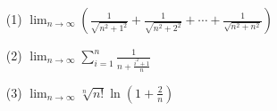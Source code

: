 \begin{xiti}
\begin{enumerate}
	\item[(1)] $\lim _ { n \rightarrow \infty } \left( \frac { 1 } { \sqrt { n ^ { 2 } + 1 ^ { 2 } } } + \frac { 1 } { \sqrt { n ^ { 2 } + 2 ^ { 2 } } } + \cdots + \frac { 1 } { \sqrt { n ^ { 2 } + n ^ { 2 } } } \right)$
	\item[(2)] $\lim _ { n \rightarrow \infty } \sum _ { i = 1 } ^ { n } \frac { 1 } { n + \frac { i ^ { 2 } + 1 } { n } }$
	\item[(3)] $\lim _ { n \rightarrow \infty } \sqrt [ n ] { n ! } \ln \left( 1 + \frac { 2 } { n } \right)$
\end{enumerate}
%	
%		
%		

\end{xiti}
